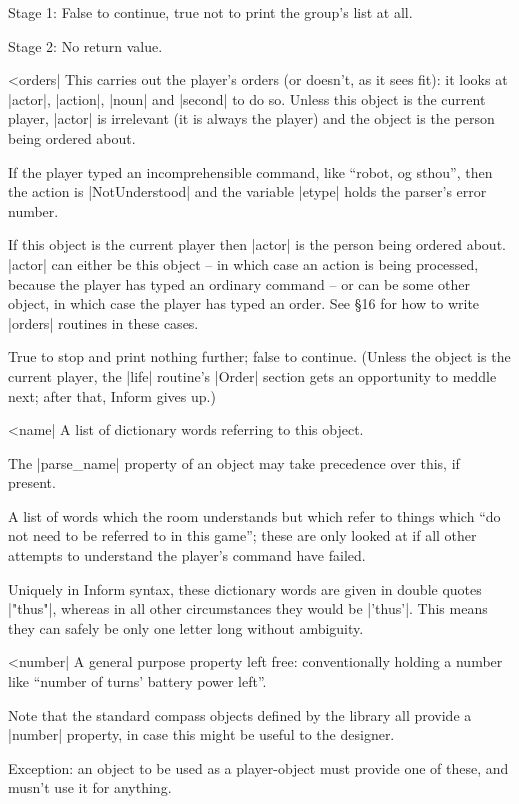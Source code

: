 \rr Stage 1: False to continue, true not to print the group's list
at all.

\rr Stage 2: No return value.

^^|orders|
\fato  This carries out the player's
orders (or doesn't, as it sees fit): it looks at |actor|, |action|,
|noun| and |second| to do so.  Unless this object is the current
player, |actor| is irrelevant (it is always the player) and the
object is the person being ordered about.

\noindent If the player typed an incomprehensible command, like
``robot, og sthou'', then the action is |NotUnderstood| and the
variable |etype| holds the parser's error number.

\noindent If this object is the current player then |actor| is
the person being ordered about.  |actor| can either be this
object -- in which case an action is being processed, because
the player has typed an ordinary command -- or can be some other
object, in which case the player has typed an order.  See
\S 16 for how to write |orders| routines in these cases.

\rr True to stop and print nothing further; false to continue.
(Unless the object is the current player, the |life| routine's
|Order| section gets an opportunity to meddle next; after that,
Inform gives up.)

^^|name|
\fo A list of dictionary words referring to this object.

\warn The |parse_name| property of an object may take precedence over this,
if present.

\fr A list of words which the room understands but which refer to things
which ``do not need to be referred to in this game''; these are only looked
at if all other attempts to understand the player's command have failed.

\warn Uniquely in Inform syntax, these dictionary words are given in double
quotes |"thus"|, whereas in all other circumstances they would be |'thus'|. 
This means they can safely be only one letter long without ambiguity.

^^|number|
A general purpose property left free: conventionally holding a number like
``number of turns' battery power left''.

\fco Note that the standard compass objects defined by the library all
provide a |number| property, in case this might be useful to the designer.

\fpo Exception: an object to be used as a player-object must provide one of
these, and musn't use it for anything.

